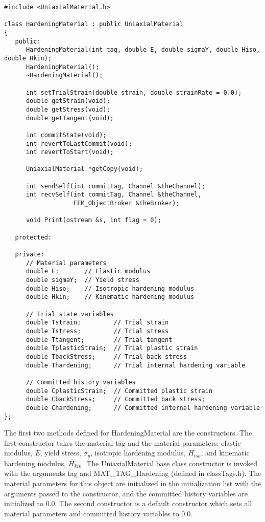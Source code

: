 \documentclass[12pt]{article}
\begin{document}
{\sf\small
\begin{verbatim}
#include <UniaxialMaterial.h>

class HardeningMaterial : public UniaxialMaterial
{
   public:
      HardeningMaterial(int tag, double E, double sigmaY, double Hiso, double Hkin);
      HardeningMaterial();
      ~HardeningMaterial();

      int setTrialStrain(double strain, double strainRate = 0.0); 
      double getStrain(void);          
      double getStress(void);
      double getTangent(void);

      int commitState(void);
      int revertToLastCommit(void);    
      int revertToStart(void);        

      UniaxialMaterial *getCopy(void);
    
      int sendSelf(int commitTag, Channel &theChannel);  
      int recvSelf(int commitTag, Channel &theChannel, 
                   FEM_ObjectBroker &theBroker);    
    
      void Print(ostream &s, int flag = 0);
    
   protected:
    
   private:
      // Material parameters
      double E;       // Elastic modulus
      double sigmaY;  // Yield stress
      double Hiso;    // Isotropic hardening modulus
      double Hkin;    // Kinematic hardening modulus
	
      // Trial state variables
      double Tstrain;         // Trial strain
      double Tstress;         // Trial stress
      double Ttangent;        // Trial tangent
      double TplasticStrain;  // Trial plastic strain
      double TbackStress;     // Trial back stress
      double Thardening;      // Trial internal hardening variable
	
      // Committed history variables
      double CplasticStrain;  // Committed plastic strain
      double CbackStress;     // Committed back stress;
      double Chardening;      // Committed internal hardening variable
};
\end{verbatim}
}

\noindent The first two methods defined for HardeningMaterial are the constructors. The
first constructor takes the material tag and the material parameters: elastic modulus,
$E$, yield stress, $\sigma_y$, isotropic hardening modulus, $H_{iso}$, and kinematic
hardening modulus, $H_{kin}$. The UniaxialMaterial
base class constructor is invoked with the arguments tag and MAT\_TAG\_Hardening (defined
in classTags.h). The material parameters for this object are initialized in
the initialization list with the arguments passed to the constructor, and the
committed history variables are initialized to $0.0$.
The second constructor is a default constructor which sets all
material parameters and committed history variables to $0.0$.
\end{document}
